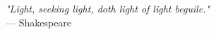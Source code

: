 \begin{flushright}
\emph{"Light, seeking light, doth light of light beguile."}\\
--- Shakespeare
\end{flushright}